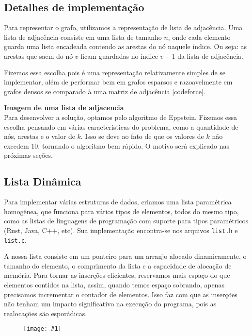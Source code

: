\documentclass[12pt]{article}
\newcommand\image[2]{\noindent \begin{figure}[h]
    \texttt{[image: \#1]}
    \label{fig: #1}
    \caption{#2}
    \end{figure}
    }
\begin{document}
    \subsection{Detalhes de implementação}
    Para representar o grafo, utilizamos a representação de lista de adjacência.
    Uma lista de adjacência consiste em uma lista de tamanho $n$, onde cada
    elemento guarda uma lista encadeada contendo as arestas do nó naquele
    índice. Ou seja: as arestas que saem do nó $v$ ficam guardadas no índice
    $v-1$ da lista de adjacência.

    Fizemos essa escolha pois é uma representação relativamente simples de se
    implementar, além de performar bem em grafos esparsos e razoavelmente em
    grafos densos se comparado à uma matriz de adjacência [codeforce].

    \textbf{Imagem de uma lista de adjacencia}
    \\

    Para desenvolver a solução, optamos pelo algoritmo de Eppstein. Fizemos essa
    escolha pensando em várias características do problema, como a quantidade de
    nós, arestas e o valor de $k$. Isso se deve ao fato de que os valores de $k$
    não excedem 10, tornando o algoritmo bem rápido. O motivo será explicado nas
    próximas seções.

    \subsection{Lista Dinâmica}
    Para implementar várias estruturas de dados, criamos uma lista paramétrica
    homogênea, que funciona para vários tipos de elementos, todos do mesmo tipo,
    como as listas de linguagens de programação com suporte para tipos
    paramétricos (Rust, Java, C++, etc). Sua implementação encontra-se nos
    arquivos \texttt{list.h} e \texttt{list.c}.

    A nossa lista consiste em um ponteiro para um arranjo alocado dinamicamente,
    o tamanho do elemento, o comprimento da lista e a capacidade de alocação de
    memória. Para tornar as inserções eficientes, reservamos mais espaço do que
    elementos contidos na lista, assim, quando temos espaço sobrando, apenas
    precisamos incrementar o contador de elementos. Isso faz com que as
    inserções não tenham um impacto significativo na execução do programa, pois
    as realocações são esporádicas.

    \image{lista}

    \newpage
\end{document}
